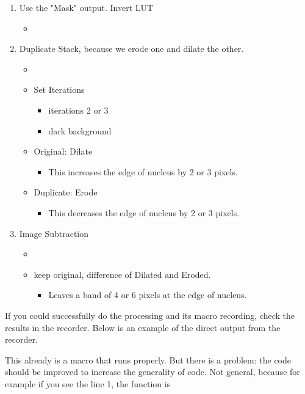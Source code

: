 \begin{enumerate}
  \item Use the "Mask" output. Invert LUT
  \begin{itemize}
    \item {}
  \end{itemize}
  \item Duplicate Stack, because we erode one and dilate the other.
  \begin{itemize}
    \item {}
    \item Set Iterations 
    \begin{itemize}
      \item iterations 2 or 3
      \item dark background
    \end{itemize}
    \item Original: Dilate 
    \begin{itemize}
      \item This increases the edge of nucleus by 2 or 3 pixels. 
    \end{itemize}
    \item Duplicate: Erode 
    \begin{itemize}
      \item This decreases the edge of nucleus by 2 or 3 pixels. 
    \end{itemize}
  \end{itemize}
  \item Image Subtraction
  \begin{itemize}
    \item {}
    \item keep original, difference of Dilated and Eroded.
    \begin{itemize}
      \item Leaves a band of 4 or 6 pixels at the edge of nucleus. 
    \end{itemize} 
  \end{itemize}
\end{enumerate}

If you could successfully do the processing and its macro recording, check the results in the recorder. Below is an example of the direct output from the recorder. 



This already is a macro that runs properly. But there is a problem: the code should be improved to increase the generality of code. Not general, because for example if you see the line 1, the function is 

